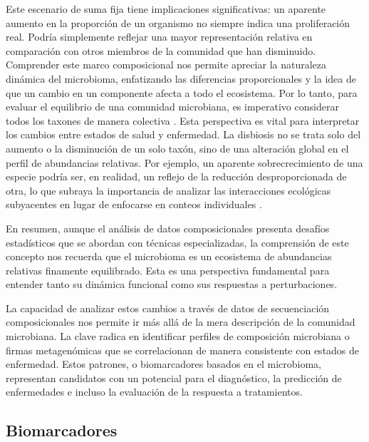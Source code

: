 Este escenario de suma fija tiene implicaciones significativas: un aparente aumento en la proporción de un organismo no siempre indica una proliferación real. Podría simplemente reflejar una mayor representación relativa en comparación con otros miembros de la comunidad que han disminuido. Comprender este marco composicional nos permite apreciar la naturaleza dinámica del microbioma, enfatizando las diferencias proporcionales y la idea de que un cambio en un componente afecta a todo el ecosistema. Por lo tanto, para evaluar el equilibrio de una comunidad microbiana, es imperativo considerar todos los taxones de manera colectiva \cite{gloor2017microbiome}. Esta perspectiva es vital para interpretar los cambios entre estados de salud y enfermedad. La disbiosis no se trata solo del aumento o la disminución de un solo taxón, sino de una alteración global en el perfil de abundancias relativas. Por ejemplo, un aparente sobrecrecimiento de una especie podría ser, en realidad, un reflejo de la reducción desproporcionada de otra, lo que subraya la importancia de analizar las interacciones ecológicas subyacentes en lugar de enfocarse en conteos individuales \cite{gloor2016s, vandeputte2017quantitative}.

En resumen, aunque el análisis de datos composicionales presenta desafíos estadísticos que se abordan con técnicas especializadas, la comprensión de este concepto nos recuerda que el microbioma es un ecosistema de abundancias relativas finamente equilibrado. Esta es una perspectiva fundamental para entender tanto su dinámica funcional como sus respuestas a perturbaciones.



La capacidad de analizar estos cambios a través de datos de secuenciación composicionales nos permite ir más allá de la mera descripción de la comunidad microbiana. La clave radica en identificar perfiles de composición microbiana o firmas metagenómicas que se correlacionan de manera consistente con estados de enfermedad. Estos patrones, o biomarcadores basados en el microbioma, representan candidatos con un potencial para el diagnóstico, la predicción de enfermedades e incluso la evaluación de la respuesta a tratamientos.

\subsection{Biomarcadores}


